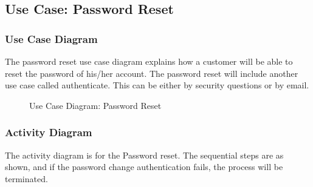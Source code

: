 \documentclass[a4paper,12pt]{report}
\begin{document}
\FloatBarrier
\subsection{Use Case: Password Reset}
\subsubsection{Use Case Diagram}
The password reset use case diagram explains how a customer will be able to reset the password of his/her account. The password reset will include another use case called authenticate. This can be either by security questions or by email.

\begin{figure}[!htbp]
	\caption{\label{fig: uc_password_reset } Use Case Diagram: Password Reset}	
\end{figure}


\subsubsection{Activity Diagram}
The activity diagram is for the Password reset. The sequential steps are as shown, and if the password change authentication fails, the process will be terminated.
\end{document}
